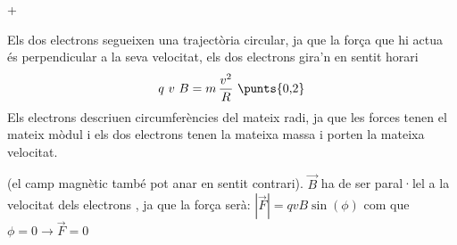 \begin{solapartat}
 + 

Els dos electrons segueixen una trajectòria circular, ja que la força que hi actua és perpendicular a la seva velocitat,  els dos electrons gira'n en sentit horari 
\[ q\ v\ B = m\,\frac{v^2}{R} \ \text{\punts{0,2}} \]
Els electrons descriuen circumferències del mateix radi, ja que les forces tenen el mateix mòdul i els dos electrons tenen la mateixa massa i porten la mateixa velocitat. 
\end{solapartat}

\begin{solapartat}

(el camp magnètic també pot anar en sentit contrari). $\vec{B}$ ha de ser paral·lel a la velocitat dels electrons , ja que la força serà: $|\vec{F}| = qvB\sin(\phi)$ com que $\phi = 0 \to \vec{F} = 0$ 
\end{solapartat}
